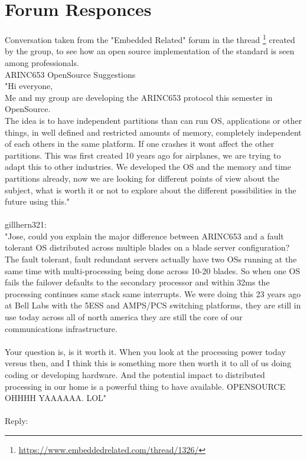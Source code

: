 \chapter{Forum Responces}

Conversation taken from the "Embedded Related" forum in the thread
\footnote{\url{https://www.embeddedrelated.com/thread/1326/}}
created by the group, to see how an open source implementation of the \arinc{}
standard is seen among professionals.\\


ARINC653 OpenSource Suggestions\\

"Hi everyone,\\

Me and my group are developing the ARINC653 protocol this semester in OpenSource.\\
The idea is to have independent partitions than can run OS, applications or other things, in well defined
and restricted amounts of memory, completely independent of each others in the same platform. If one
crashes it won\textquotesingle t affect the other partitions. This was first created 10 years ago for airplanes, we are
trying to adapt this to other industries. We developed the OS and the memory and time partitions already,
now we are looking for different points of view about the subject, what is worth it or not to explore 
about the different possibilities in the future using this."\\
\\
gillhern321:\\

"Jose, could you explain the major difference between ARINC653 and a fault tolerant OS distributed across 
multiple blades on a blade server configuration? The fault tolerant, fault redundant servers actually have 
two OS\textquotesingle s running at the same time with multi-processing being done across 10-20 blades. So when one OS 
fails the failover defaults to the secondary processor and within 32ms the processing continues same stack 
same interrupts. We were doing this 23 years ago at Bell Labs with the 5ESS and AMPS/PCS switching 
platforms, they are still in use today across all of north america they are still the core of our 
communications infrastructure.\\
\\

Your question is, is it worth it. When you look at the processing power today versus then,  and I think 
this is something more then worth it to all of us doing coding or developing hardware. And the potential 
impact to distributed processing in our home is a powerful thing to have available.  OPENSOURCE     OHHHH 
YAAAAAA. LOL"\\
\\
Reply:\\

